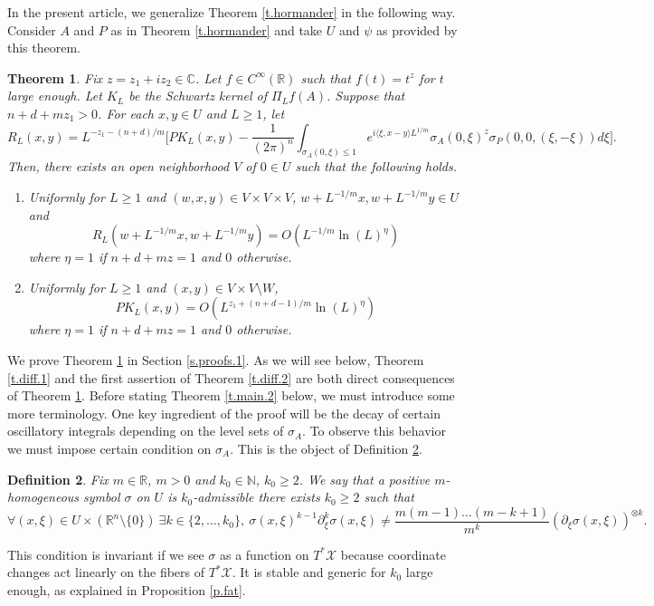 \documentclass[10pt,twoside]{article}
\newcommand{\R}{\mathbb{R}}
\newcommand{\C}{\mathbb{C}}
\newcommand{\N}{\mathbb{N}}
\newcommand{\man}{\mathcal{X}}
\newtheorem{theorem}{Theorem}
\numberwithin{theorem}{section}
\newtheorem{definition}[theorem]{Definition}
\begin{document}
In the present article, we generalize Theorem \ref{t.hormander} in the following way. Consider $A$ and $P$ as in Theorem \ref{t.hormander} and take $U$ and $\psi$ as provided by this theorem.
\begin{theorem}\label{t.main.1}
Fix $z=z_1+iz_2\in\C$. Let $f\in C^\infty(\R)$ such that $f(t)=t^z$ for $t$ large enough. Let $K_L$ be the Schwartz kernel of $\Pi_Lf(A)$. Suppose that $n+d+mz_1>0$. For each $x,y\in U$ and $L\geq 1$, let
\[R_L(x,y)=L^{-z_1-(n+d)/m}\Big[PK_L(x,y)-\frac{1}{(2\pi)^n}\int_{\sigma_A(0,\xi)\leq 1}e^{i\langle \xi,x-y\rangle L^{1/m}}\sigma_A(0,\xi)^z\sigma_P(0,0,(\xi,-\xi))d\xi\Big].\]
Then, there exists an open neighborhood $V$ of $0\in U$ such that the following holds.
\begin{enumerate}
\item Uniformly for $L\geq 1$ and $(w,x,y)\in V\times V\times V$, $w+L^{-1/m}x, w+L^{-1/m}y\in U$ and
\[
R_L\left(w+L^{-1/m}x,w+L^{-1/m}y\right)=O\left(L^{-1/m}\ln(L)^\eta\right)
\]
where $\eta=1$ if $n+d+mz=1$ and $0$ otherwise.
\item Uniformly for $L\geq 1$ and $(x,y)\in V\times V\setminus W$,
\[
PK_L(x,y)=O\left(L^{z_1+(n+d-1)/m}\ln(L)^\eta\right)
\]
where $\eta=1$ if $n+d+mz=1$ and $0$ otherwise.
\end{enumerate}
\end{theorem}
We prove Theorem \ref{t.main.1} in Section \ref{s.proofs.1}. As we will see below, Theorem \ref{t.diff.1} and the first assertion of Theorem \ref{t.diff.2} are both direct consequences of Theorem \ref{t.main.1}. Before stating Theorem \ref{t.main.2} below, we must introduce some more terminology. One key ingredient of the proof will be the decay of certain oscillatory integrals depending on the level sets of $\sigma_A$. To observe this behavior we must impose certain condition on $\sigma_A$. This is the object of Definition \ref{d.admissible}.
\begin{definition}\label{d.admissible}
Fix $m\in\R$, $m>0$ and $k_0\in\N$, $k_0\geq 2$. We say that a positive $m$-homogeneous symbol $\sigma$ on $U$ is $k_0$-admissible there exists $k_0\geq 2$ such that
\begin{equation}\label{e.admissible}
\forall (x,\xi)\in U\times(\R^n\setminus \{0\})\ \exists k\in\{2,\dots,k_0\},\ \sigma(x,\xi)^{k-1}\partial_\xi^k\sigma(x,\xi)\neq \frac{m(m-1)\dots(m-k+1)}{m^k}(\partial_\xi\sigma(x,\xi))^{\otimes k}.
\end{equation}
\end{definition}
This condition is invariant if we see $\sigma$ as a function on $T^*\man$ because coordinate changes act linearly on the fibers of $T^*\man$. It is stable and generic for $k_0$ large enough, as explained in Proposition \ref{p.fat}.\\
\end{document}
